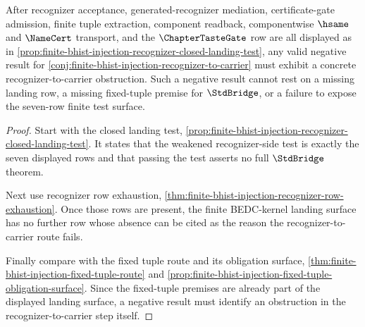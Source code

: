 \begin{theorem}
\label{thm:finite-bhist-injection-recognizer-refutation-test}
After recognizer acceptance, generated-recognizer mediation, certificate-gate admission, finite tuple extraction, component readback, componentwise $\hsame$ and $\NameCert$ transport, and the $\ChapterTasteGate$ row are all displayed as in \autoref{prop:finite-bhist-injection-recognizer-closed-landing-test}, any valid negative result for \autoref{conj:finite-bhist-injection-recognizer-to-carrier} must exhibit a concrete recognizer-to-carrier obstruction. Such a negative result cannot rest on a missing landing row, a missing fixed-tuple premise for $\StdBridge$, or a failure to expose the seven-row finite test surface.
\end{theorem}
\begin{proof}
Start with the closed landing test, \autoref{prop:finite-bhist-injection-recognizer-closed-landing-test}. It states that the weakened recognizer-side test is exactly the seven displayed rows and that passing the test asserts no full $\StdBridge$ theorem.

Next use recognizer row exhaustion, \autoref{thm:finite-bhist-injection-recognizer-row-exhaustion}. Once those rows are present, the finite BEDC-kernel landing surface has no further row whose absence can be cited as the reason the recognizer-to-carrier route fails.

Finally compare with the fixed tuple route and its obligation surface, \autoref{thm:finite-bhist-injection-fixed-tuple-route} and \autoref{prop:finite-bhist-injection-fixed-tuple-obligation-surface}. Since the fixed-tuple premises are already part of the displayed landing surface, a negative result must identify an obstruction in the recognizer-to-carrier step itself.
\end{proof}

